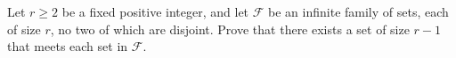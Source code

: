 Let $r \geq 2$ be a fixed positive integer, and let $\mathcal{F}$ be an infinite family of sets, each of size $r$, no two of which are disjoint. Prove that there exists a set of size $r - 1$ that meets each set in $\mathcal{F}$.
